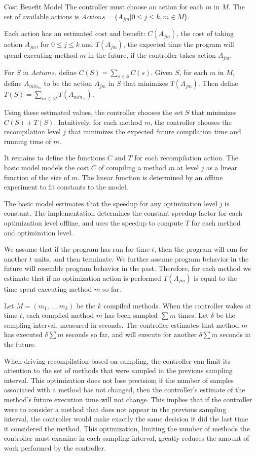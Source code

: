 \begin{section}{Cost Benefit Model}
The controller must choose an action for each $m$ in $M$. The set of available actions is $Actions = \{A_{jm} | 0 \leq j \leq k, m \in M\}$.

Each action has an estimated cost and benefit: $C(A_{jm})$, the cost of taking action $A_{jm}$, for $0 \leq j \leq k$ and $T(A_{jm})$, the expected time the program will spend executing method $m$ in the future, if the controller takes action $A_{jm}$.

For $S$ in $Actions$, define $C(S) = \sum_{s \in S} C(s)$. Given $S$, for each $m$ in $M$, define $A_{min_m}$ to be the action $A_{jm}$ in $S$ that minimizes $T(A_{jm})$.  Then define $T(S) = \sum_{m \in M} T(A_{min_m})$.

Using these estimated values, the controller chooses the set $S$ that minimizes $C(S) + T(S)$. Intuitively, for each method $m$, the controller chooses the recompilation level $j$ that minimizes the expected future compilation time and running time of $m$.

It remains to define the functions $C$ and $T$ for each recompilation action. The basic model models the cost $C$ of compiling a method $m$ at level $j$ as a linear function of the size of $m$. The linear function is determined by an offline experiment to fit constants to the model.

The basic model estimates that the speedup for any optimization level $j$ is constant. The implementation determines the constant speedup factor for each optimization level offline, and uses the speedup to compute $T$ for each method and optimization level.

We assume that if the program has run for time $t$, then the program will run for another $t$ units, and then terminate. We further assume program behavior in the future will resemble program behavior in the past. Therefore, for each method we estimate that if no optimization action is performed $T(A_{jm})$ is equal to the time spent executing method $m$ so far.

Let $M=(m_1, ..., m_k)$ be the $k$ compiled methods. When the controller wakes at time $t$, each compiled method $m$ has been sampled $\sum m$ times. Let $\delta$ be the sampling interval, measured in seconds. The controller estimates that method $m$ has executed $\delta \sum m$ seconds so far, and will execute for another $\delta \sum m$ seconds in the future.

When driving recompilation based on sampling, the controller can limit its attention to the set of methods that were sampled in the previous sampling interval. This optimization does not lose precision; if the number of samples associated with a method has not changed, then the controller's estimate of the method's future execution time will not change. This implies that if the controller were to consider a
method that does not appear in the previous sampling interval, the controller would make exactly the same decision it did the last time it considered the method. This optimization, limiting the number of methods the controller must examine in each sampling interval, greatly reduces the amount of work performed by the controller.


\end{section}
